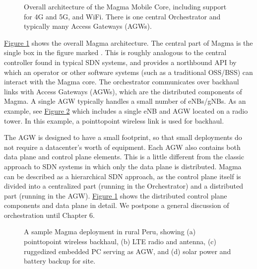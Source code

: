 \documentclass[a4paper,11pt,english]{sphinxmanual}
\let\sphinxpxdimen\pdfpxdimen\else\newdimen\sphinxpxdimen
\begin{document}
\begin{figure}[ht]
\centering
\capstart

\noindent\sphinxincludegraphics[width=600\sphinxpxdimen]{{Slide112}.png}
\caption{Overall architecture of the Magma Mobile Core, including
support for 4G and 5G, and Wi\sphinxhyphen{}Fi. There is one central
Orchestrator and typically many Access Gateways (AGWs).}\label{\detokenize{core:id5}}\label{\detokenize{core:fig-magma-arch}}\end{figure}

\sphinxAtStartPar
\hyperref[\detokenize{core:fig-magma-arch}]{Figure \ref{\detokenize{core:fig-magma-arch}}} shows the overall Magma
architecture. The central part of Magma is the single box in the
figure marked . This is
roughly analogous to the central controller found in typical SDN
systems, and provides a northbound API by which an operator or other
software systems (such as a traditional OSS/BSS) can interact with the
Magma core. The orchestrator communicates over backhaul links with
Access Gateways (AGWs), which are the distributed components of
Magma. A single AGW typically handles a small number of eNBs/gNBs. As
an example, see \hyperref[\detokenize{core:fig-magma-peru}]{Figure \ref{\detokenize{core:fig-magma-peru}}} which includes a
single eNB and AGW located on a radio tower. In this example, a
point\sphinxhyphen{}to\sphinxhyphen{}point wireless link is used for backhaul.

\sphinxAtStartPar
The AGW is designed to have a small footprint, so that small
deployments do not require a datacenter’s worth of equipment. Each AGW
also contains both data plane and control plane elements. This is a
little different from the classic approach to SDN systems in which
only the data plane is distributed. Magma can be described as a
hierarchical SDN approach, as the control plane itself is divided into
a centralized part (running in the Orchestrator) and a distributed
part (running in the AGW). \hyperref[\detokenize{core:fig-magma-arch}]{Figure \ref{\detokenize{core:fig-magma-arch}}} shows
the distributed control plane components and data plane in detail. We
postpone a general discussion of orchestration until Chapter 6.

\begin{figure}[ht]
\centering
\capstart

\noindent\sphinxincludegraphics[width=300\sphinxpxdimen]{{peru_deploy_labelled}.jpg}
\caption{A sample Magma deployment in rural Peru, showing (a)
point\sphinxhyphen{}to\sphinxhyphen{}point wireless backhaul, (b) LTE radio and antenna, (c)
ruggedized embedded PC serving as AGW, and (d) solar power and
battery backup for site.}\label{\detokenize{core:id6}}\label{\detokenize{core:fig-magma-peru}}\end{figure}
\end{document}
